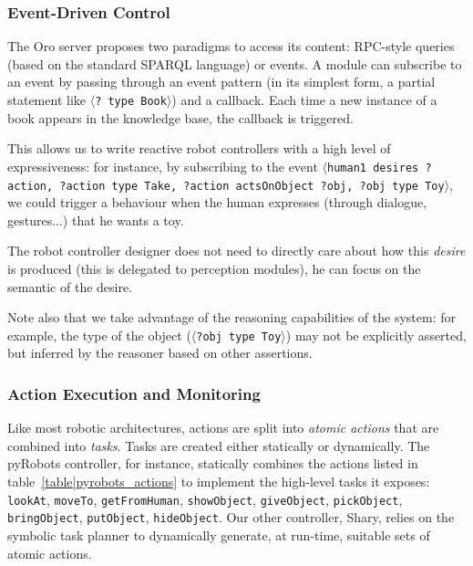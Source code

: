 \documentclass[preprint,3p,times]{elsarticle}
\newcommand{\stmt}[1]{{\footnotesize\tt$\langle$#1\relax$\rangle$}}
\begin{document}
\subsubsection{Event-Driven Control}

The {\sc Oro} server proposes two paradigms to access its content: RPC-style
queries (based on the standard SPARQL language) or events. A module can
subscribe to an event by passing through an event pattern (in its simplest
form, a partial statement like \stmt{? type Book}) and a callback.  Each
time a new instance of a book appears in the knowledge base, the callback is
triggered.

This allows us to write reactive robot controllers with a high level of
expressiveness: for instance, by subscribing to the event \stmt{human1 desires
?action, ?action type Take, ?action actsOnObject ?obj, ?obj type Toy}, we could trigger a
behaviour when the human expresses (through dialogue, gestures...) that he
wants a toy.

The robot controller designer does not need to directly care about how this
\emph{desire} is produced (this is delegated to perception modules), he can
focus on the semantic of the desire.

Note also that we take advantage of the reasoning capabilities of the system:
for example, the type of the object (\stmt{?obj type Toy}) may not be
explicitly asserted, but inferred by the reasoner based on other assertions.

\subsubsection{Action Execution and Monitoring}\label{sec:action}

Like most robotic architectures, actions are split into \emph{atomic actions}
that are combined into \emph{tasks}. Tasks are created either statically or dynamically.
The {\sc pyRobots} controller, for instance, statically combines the actions listed in
table~\ref{table|pyrobots_actions} to implement the high-level tasks it exposes: {\tt
lookAt}, {\tt moveTo}, {\tt getFromHuman}, {\tt showObject}, {\tt giveObject},
{\tt pickObject}, {\tt bringObject}, {\tt putObject}, {\tt hideObject}.
Our other controller, {\sc Shary}, relies on the symbolic task planner to
dynamically generate, at run-time, suitable sets of atomic actions.
\end{document}
